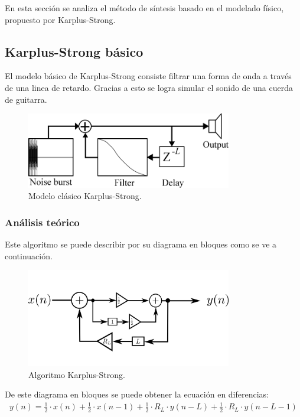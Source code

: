En esta sección se analiza el método de síntesis basado en el modelado físico, propuesto por Karplus-Strong.

\subsection{Karplus-Strong básico}
El modelo básico de Karplus-Strong consiste filtrar una forma de onda a través de una linea de retardo. Gracias a esto se logra simular el sonido de una cuerda de guitarra.
\begin{figure}[H]
	\centering
	\includegraphics[width=0.8\textwidth]{ImagenesEjercicio4/ksinit.PNG}
\caption{Modelo clásico Karplus-Strong.}
	\label{fig:kscl}
\end{figure}

\subsubsection{Análisis teórico}
Este algoritmo se puede describir por su diagrama en bloques como se ve a continuación.
\begin{figure}[H]
	\centering
	\includegraphics[width=0.8\textwidth]{ImagenesEjercicio4/ksclasic.PNG}
\caption{Algoritmo Karplus-Strong.}
	\label{fig:ksclasico}
\end{figure}
De este diagrama en bloques se puede obtener la ecuación en diferencias:
\begin{align}
y(n) = \frac{1}{2}\cdot x(n) +\frac{1}{2}\cdot x(n-1) + \frac{1}{2}\cdot R_L \cdot y(n-L) + \frac{1}{2}\cdot R_L \cdot y(n-L-1) 
\label{eq:eqdif}
\end{align}

